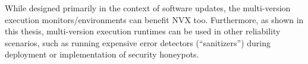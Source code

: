 While designed primarily in the context of software updates, the multi-version
execution monitors/environments can benefit NVX too. Furthermore, as shown in
this thesis, multi-version execution runtimes can be used in other reliability
scenarios, such as running expensive error detectors (``sanitizers'') during
deployment or implementation of security honeypots.








